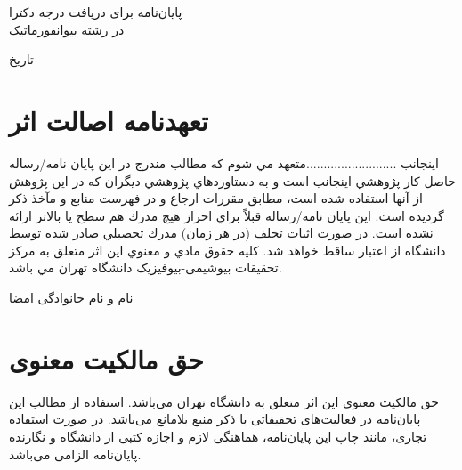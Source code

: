 \documentclass[12pt]{report}
\begin{document}
\vfill
{\small
\begin{center}
 پایان‌نامه برای دریافت درجه دکترا
\\
در رشته بیوانفورماتیک
\end{center}

\begin{center}
تاریخ 
\end{center}
}
\pagestyle{empty}
\pagenumbering{}


\pagestyle{plain}
\setcounter{page}{1}






\chapter*{تعهدنامه اصالت اثر}
اينجانب  ..........................متعهد مي شوم كه مطالب مندرج در اين پايان نامه/رساله حاصل كار پژوهشي اينجانب است و به دستاوردهاي پژوهشي ديگران كه در اين پژوهش از آنها استفاده شده است، مطابق مقررات ارجاع و در فهرست منابع و مآخذ ذكر گرديده است. اين پايان نامه/رساله قبلاً براي احراز هيچ مدرك هم سطح يا بالاتر ارائه نشده است. در صورت اثبات تخلف (در هر زمان) مدرك تحصيلي صادر شده توسط دانشگاه از اعتبار ساقط خواهد شد. 
كليه حقوق مادي و معنوي اين اثر متعلق به مرکز تحقیقات بیوشیمی-بیوفیزیک دانشگاه تهران مي باشد. 
\begin{flushleft}
نام و نام خانوادگی
امضا 
\end{flushleft}

\chapter*{حق مالکیت معنوی}
حق مالکیت معنوی این اثر متعلق به دانشگاه تهران می‌باشد. استفاده از مطالب این پایان‌نامه در فعالیت‌های تحقیقاتی با ذکر منبع بلامانع می‌باشد. در صورت استفاده تجاری، مانند چاپ این پایان‌نامه، هماهنگی لازم و اجازه کتبی از دانشگاه و نگارنده پایان‌نامه الزامی می‌باشد.
\end{document}
